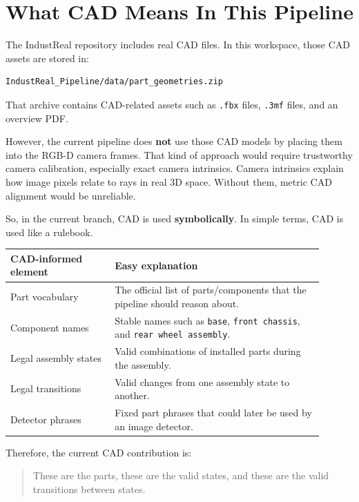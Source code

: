\documentclass[11pt,a4paper]{article}
\begin{document}
\section{What CAD Means In This Pipeline}

The IndustReal repository includes real CAD files. In this workspace, those CAD assets are stored in:

\begin{lstlisting}
IndustReal_Pipeline/data/part_geometries.zip
\end{lstlisting}

That archive contains CAD-related assets such as \texttt{.fbx} files, \texttt{.3mf} files, and an overview PDF.

However, the current pipeline does \textbf{not} use those CAD models by placing them into the RGB-D camera frames. That kind of approach would require trustworthy camera calibration, especially exact camera intrinsics. Camera intrinsics explain how image pixels relate to rays in real 3D space. Without them, metric CAD alignment would be unreliable.

So, in the current branch, CAD is used \textbf{symbolically}. In simple terms, CAD is used like a rulebook.

\begin{longtable}{p{0.30\linewidth} p{0.60\linewidth}}
\toprule
\textbf{CAD-informed element} & \textbf{Easy explanation} \\
\midrule
\endhead
Part vocabulary & The official list of parts/components that the pipeline should reason about. \\
Component names & Stable names such as \texttt{base}, \texttt{front chassis}, and \texttt{rear wheel assembly}. \\
Legal assembly states & Valid combinations of installed parts during the assembly. \\
Legal transitions & Valid changes from one assembly state to another. \\
Detector phrases & Fixed part phrases that could later be used by an image detector. \\
\bottomrule
\end{longtable}

Therefore, the current CAD contribution is:

\begin{quote}
These are the parts, these are the valid states, and these are the valid transitions between states.
\end{quote}
\end{document}
